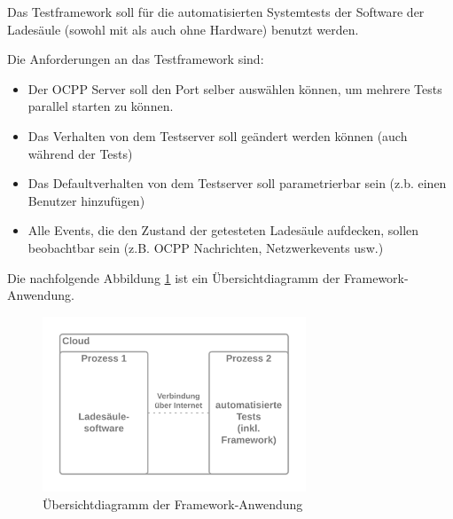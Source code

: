 Das Testframework soll für die automatisierten Systemtests der Software der Ladesäule (sowohl mit als auch ohne Hardware) benutzt werden.

Die Anforderungen an das Testframework sind:
\begin{itemize}
    \item Der OCPP Server soll den Port selber auswählen können, um mehrere Tests parallel starten zu können.
    \item Das Verhalten von dem Testserver soll geändert werden können (auch während der Tests)
    \item Das Defaultverhalten von dem Testserver soll parametrierbar sein (z.b. einen Benutzer hinzufügen)
    \item Alle Events, die den Zustand der getesteten Ladesäule aufdecken, sollen beobachtbar sein (z.B. OCPP Nachrichten, Netzwerkevents usw.)
\end{itemize}

Die nachfolgende Abbildung \ref{fig:summaryDiagrammFramework} ist ein Übersichtdiagramm der Framework-Anwendung.
\begin{figure}[H]
    \centering
    \includegraphics[width=0.7\textwidth]{./images/Framework.png}
    \caption[Übersichtdiagramm der Framework-Anwendung]{Übersichtdiagramm der Framework-Anwendung}
    \label{fig:summaryDiagrammFramework}
\end{figure}